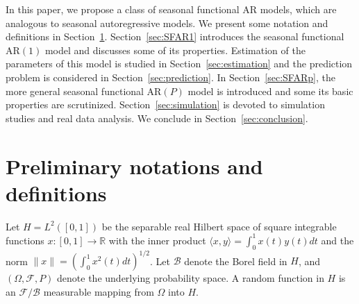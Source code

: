 \documentclass[11pt,a4paper]{article}
\numberwithin{equation}{section}
\begin{document}
In this paper, we propose a class of seasonal functional AR models, which are analogous to seasonal autoregressive models. We present some notation and definitions in Section~\ref{sec:notation}. Section~\ref{sec:SFAR1} introduces the seasonal functional AR$(1)$ model and discusses some of its properties. Estimation of the parameters of this model is studied in Section~\ref{sec:estimation} and the prediction problem is considered in Section~\ref{sec:prediction}. In Section~\ref{sec:SFARp}, the more general seasonal functional AR$(P)$ model is introduced and some its basic properties are scrutinized. Section~\ref{sec:simulation} is devoted to simulation studies and real data analysis. We conclude in Section~\ref{sec:conclusion}.


\section{Preliminary notations and definitions}\label{sec:notation}

Let $H=L^2([0,1])$ be the separable real Hilbert space of square integrable functions $x : [0,1] \rightarrow \mathbb{R}$ with the inner product $\langle x,y\rangle=\int_0^1 x(t)y(t)dt$ and the norm $\|x\|=\left(\int_0^1 x^2(t)dt\right)^{1/2}$. Let $\mathcal{B}$ denote the Borel field in $H$, and $(\Omega, \mathcal{F}, P)$ denote the underlying probability space. A random function in $H$ is an $\mathcal{F}/\mathcal{B}$ measurable mapping from $\Omega$ into $H$.
\end{document}
